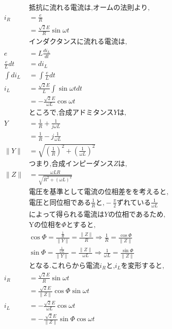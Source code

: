 \documentclass[twocolumn]{article}
\begin{document}
\begin{enumerate}
    \begin{align*}      
      &\text{抵抗に流れる電流は,オームの法則より,}\\
      i_R &= \frac{e}{R}\\
          &= \frac{\sqrt{2}E}{R}\sin \omega t\\
      &\text{インダクタンスに流れる電流は,}\\
      e   &= L\frac{di_L}{dt}\\
      \frac{e}{L}dt &= di_L\\
      \int di_L &= \int \frac{e}{L}dt\\
      i_L &= \frac{\sqrt{2}E}{L} \int \sin \omega t dt\\
          &= -\frac{\sqrt{2}E}{\omega L} \cos \omega t\\
      &\text{ところで,合成アドミタンス}Y\text{は,}\\
      Y   &= \frac{1}{R} + \frac{1}{j\omega L}\\
          &= \frac{1}{R} - j\frac{1}{\omega L}\\
      \|Y\| &= \sqrt{{\left(\frac{1}{R}\right)}^2 + {\left(\frac{1}{\omega L}\right)}^2}\\
      &\text{つまり,合成インピーダンス}Z\text{は,}\\
      \|Z\| &= \frac{\omega LR}{\sqrt{R^2 + {\left(\omega L\right)}^2}}\\
      &\text{電圧を基準として電流の位相差をを考えると,}\\
      &\text{電圧と同位相である}\frac{1}{R}\text{と,}-\frac{\pi}{2}\text{ずれている}\frac{1}{\omega L}\\
      &\text{によって得られる電流は}Y\text{の位相であるため,}\\
      &\text{Yの位相を}\Phi\text{とすると,}\\
      &\cos \Phi = \frac{\frac{1}{R}}{\|Y\|} = \frac{\|Z\|}{R} \Rightarrow  \frac{1}{R} = \frac{\cos \Phi}{\|Z\|}\\
      &\sin \Phi = \frac{\frac{1}{\omega L}}{\|Y\|} = \frac{\|Z\|}{\omega L} \Rightarrow  \frac{1}{\omega L} = \frac{\sin \Phi}{\|Z\|}\\
      &\text{となる.これらから電流}i_R\text{と,}i_L\text{を変形すると,}\\
      i_R   &= \frac{\sqrt{2}E}{R}\sin \omega t\\
            &= \frac{\sqrt{2}E}{\|Z\|}\cos \Phi \sin \omega t\\
      i_L   &= -\frac{\sqrt{2}E}{\omega L} \cos \omega t\\
            &= -\frac{\sqrt{2}E}{\|Z\|} \sin \Phi \cos \omega t\\

\end{align*}
\end{enumerate}
\end{document}
